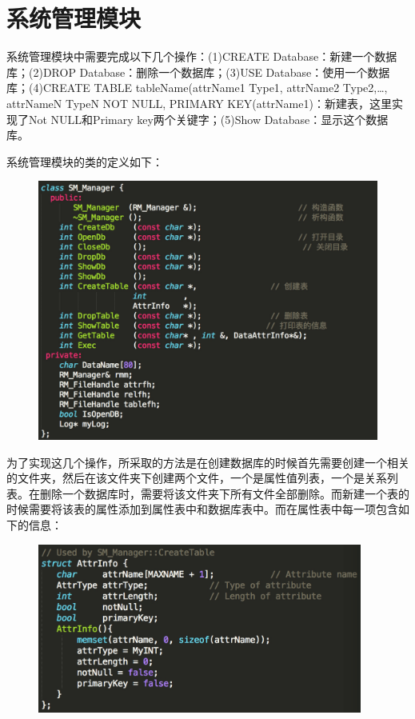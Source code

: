 \section{系统管理模块}
系统管理模块中需要完成以下几个操作：(1)CREATE Database：新建一个数据库；(2)DROP Database：删除一个数据库；(3)USE Database：使用一个数据库；(4)CREATE TABLE tableName(attrName1 Type1, attrName2 Type2,…, attrNameN TypeN NOT NULL, PRIMARY KEY(attrName1)：新建表，这里实现了Not NULL和Primary key两个关键字；(5)Show Database：显示这个数据库。

系统管理模块的类的定义如下：

\begin{figure}[H]
\centering
\includegraphics[width=5in]{Figures/SM_Manager.jpg}
\end{figure}

为了实现这几个操作，所采取的方法是在创建数据库的时候首先需要创建一个相关的文件夹，然后在该文件夹下创建两个文件，一个是属性值列表，一个是关系列表。在删除一个数据库时，需要将该文件夹下所有文件全部删除。而新建一个表的时候需要将该表的属性添加到属性表中和数据库表中。而在属性表中每一项包含如下的信息：

\begin{figure}[H]
\centering
\includegraphics[width=4.2in]{Figures/AttrInfo.jpg}
\end{figure}

